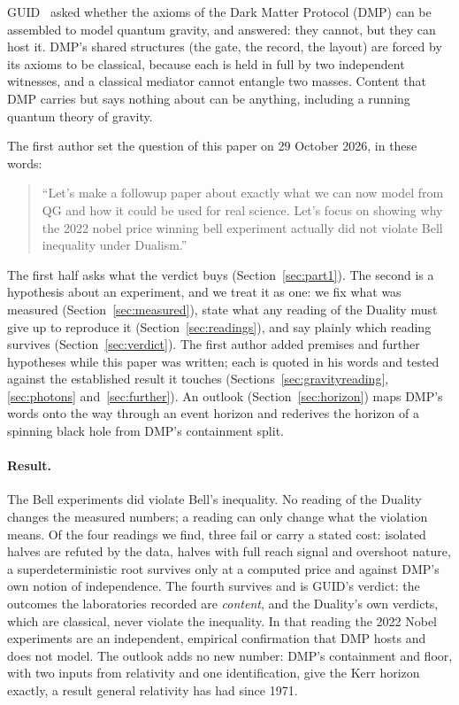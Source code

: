 \documentclass[11pt,a4paper]{article}
\theoremstyle{definition}
\theoremstyle{remark}
\begin{document}
GUID~\cite{guid} asked whether the axioms of the Dark Matter Protocol (DMP) can be assembled to model quantum gravity, and answered: they
cannot, but they can host it. DMP's shared structures (the gate, the record, the layout) are forced by its axioms to be classical,
because each is held in full by two independent witnesses, and a classical mediator cannot entangle two masses. Content that DMP carries
but says nothing about can be anything, including a running quantum theory of gravity.

The first author set the question of this paper on 29 October 2026, in these words:

\begin{quote}
``Let's make a followup paper about exactly what we can now model from QG and how it could be used for real science. Let's focus on
showing why the 2022 nobel price winning bell experiment actually did not violate Bell inequality under Dualism.''
\end{quote}

\noindent The first half asks what the verdict buys (Section~\ref{sec:part1}). The second is a hypothesis about an experiment, and we treat
it as one: we fix what was measured (Section~\ref{sec:measured}), state what any reading of the Duality must give up to reproduce it
(Section~\ref{sec:readings}), and say plainly which reading survives (Section~\ref{sec:verdict}). The first author added premises and
further hypotheses while this paper was written; each is quoted in his words and tested against the established result it touches
(Sections~\ref{sec:gravityreading}, \ref{sec:photons} and~\ref{sec:further}). An outlook (Section~\ref{sec:horizon}) maps DMP's words
onto the way through an event horizon and rederives the horizon of a spinning black hole from DMP's containment split.

\paragraph{Result.} The Bell experiments did violate Bell's inequality. No reading of the Duality changes the measured numbers; a reading
can only change what the violation means. Of the four readings we find, three fail or carry a stated cost: isolated halves are refuted by
the data, halves with full reach signal and overshoot nature, a superdeterministic root survives only at a computed price and against
DMP's own notion of independence. The fourth survives and is GUID's verdict: the outcomes the laboratories recorded are \emph{content},
and the Duality's own verdicts, which are classical, never violate the inequality. In that reading the 2022 Nobel experiments are an
independent, empirical confirmation that DMP hosts and does not model. The outlook adds no new number: DMP's containment and floor, with
two inputs from relativity and one identification, give the Kerr horizon exactly, a result general relativity has had since 1971.
\end{document}
